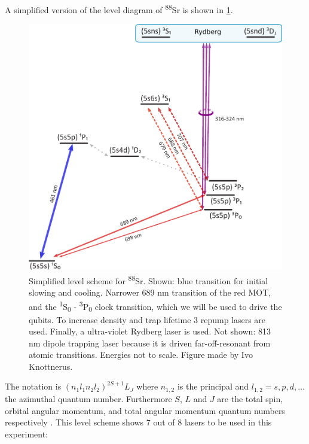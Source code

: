 A simplified version of the level diagram of \textsuperscript{88}Sr is shown in \cref{fig:SrLevel}. 
\begin{figure}
	\centering
	\includegraphics[width=0.76\linewidth]{figures/SrLevelRydberg.pdf}
	\caption{Simplified level scheme for \textsuperscript{88}Sr. 
	Shown: blue transition for initial slowing and cooling.
	Narrower 689 nm transition of the red \ac{MOT}, and the \textsuperscript{1}S\textsubscript{0} - \textsuperscript{3}P\textsubscript{0} clock transition, which we will be used to drive the qubits. 
	To increase density and trap lifetime 3 repump lasers are used. 
	Finally, a ultra-violet Rydberg laser is used.
	Not shown: 813 nm dipole trapping laser because it is driven far-off-resonant from atomic transitions. Energies not to scale. Figure made by Ivo Knottnerus.}
	\label{fig:SrLevel}
\end{figure}
The notation is $(n_1l_1 n_2l_2)^{2S+1}L_J$ where $n_{1,2}$ is the principal and $l_{1,2} = s, p, d, \ldots$ the azimuthal quantum number. 
Furthermore $S$, $L$ and $J$ are the total spin, orbital angular momentum, and total angular momentum quantum numbers respectively \cite{Cowan1981}. 
This level scheme shows 7 out of 8 lasers to be used in this experiment:

